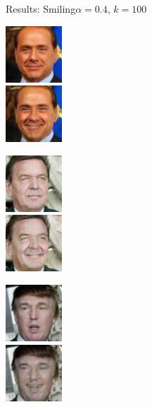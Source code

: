\documentclass[11pt]{beamer}
\begin{document}
\begin{frame}{Results: Smiling}{$\alpha=0.4$, $k=100$}
	\centering
	\begin{minipage}{81px}
		\includegraphics[width=80px]{../pictures/outputs/start-imgs/Berlusconi.png}\\
		\includegraphics[width=80px]{../pictures/outputs/smiling_alpha0.4_k100/Berlusconi.png}
	\end{minipage}%
	\begin{minipage}{81px}
		\includegraphics[width=80px]{../pictures/outputs/start-imgs/Schroeder.png}\\
		\includegraphics[width=80px]{../pictures/outputs/smiling_alpha0.4_k100/Schroeder.png}
	\end{minipage}%
	\begin{minipage}{81px}
		\includegraphics[width=80px]{../pictures/outputs/start-imgs/Trump.png}\\
		\includegraphics[width=80px]{../pictures/outputs/smiling_alpha0.4_k100/Trump.png}

\end{minipage}
\end{frame}
\end{document}
